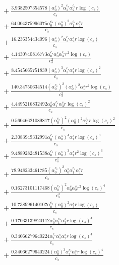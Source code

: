 \documentclass[10pt]{article}
\begin{document}
\begin{align*}
&{}  + \frac{3.9382507354578 \left(\alpha_{0}^s\right)^{2} \alpha_{1}^{c_s} \alpha_{2}^{c_s} r \log{\left(c_{s} \right)}}{c_{s}} \\
&{}  + \frac{64.004375996075 \alpha_{0}^{c_s} \left(\alpha_{0}^s\right)^{2} \alpha_{1}^{c_s} \alpha_{1}^s r}{c_{s}} \\
&{}  + \frac{16.236354434096 \left(\alpha_{0}^s\right)^{2} \alpha_{1}^{c_s} \alpha_{2}^s r \log{\left(c_{s} \right)}}{c_{s}} \\
&{}  + \frac{4.1430740816773 \alpha_{0}^{c_s} \alpha_{0}^s \alpha_{3}^{c_s} r^{2} \log{\left(c_{s} \right)}}{c_{s}^{2}} \\
&{}  + \frac{8.4545665751839 \left(\alpha_{0}^s\right)^{3} \alpha_{1}^{c_s} \alpha_{1}^s r \log{\left(c_{s} \right)}^{2}}{c_{s}} \\
&{}  + \frac{140.34750634514 \left(\alpha_{0}^{c_s}\right)^{2} \left(\alpha_{0}^s\right)^{2} \alpha_{1}^s r^{2} \log{\left(c_{s} \right)}}{c_{s}^{2}} \\
&{}  + \frac{4.4495216832492 \alpha_{0}^s \alpha_{1}^{c_s} \alpha_{3}^s r \log{\left(c_{s} \right)}^{2}}{c_{s}} \\
&{}  + \frac{0.56046621089817 \left(\alpha_{0}^{c_s}\right)^{2} \left(\alpha_{0}^s\right)^{2} \alpha_{2}^{c_s} r \log{\left(c_{s} \right)}^{2}}{c_{s}} \\
&{}  + \frac{2.3083949332991 \alpha_{0}^{c_s} \left(\alpha_{0}^s\right)^{4} \alpha_{1}^s r \log{\left(c_{s} \right)}^{3}}{c_{s}} \\
&{}  + \frac{9.4889282481538 \alpha_{0}^{c_s} \left(\alpha_{0}^s\right)^{3} \alpha_{1}^s r^{2} \log{\left(c_{s} \right)}^{3}}{c_{s}^{2}} \\
&{}  + \frac{78.948233461785 \left(\alpha_{0}^{c_s}\right)^{2} \alpha_{0}^s \alpha_{1}^{c_s} \alpha_{1}^s r}{c_{s}} \\
&{}  + \frac{0.16273101117468 \left(\alpha_{0}^{c_s}\right)^{2} \alpha_{0}^s \alpha_{2}^s r^{2} \log{\left(c_{s} \right)}^{4}}{c_{s}^{2}} \\
&{}  + \frac{10.738996140107 \alpha_{0}^{c_s} \left(\alpha_{0}^s\right)^{2} \alpha_{3}^s r \log{\left(c_{s} \right)}}{c_{s}} \\
&{}  + \frac{0.17033139820112 \alpha_{0}^s \alpha_{1}^{c_s} \alpha_{3}^s r \log{\left(c_{s} \right)}^{4}}{c_{s}} \\
&{}  + \frac{0.34066279640224 \alpha_{1}^{c_s} \alpha_{1}^s \alpha_{2}^s r \log{\left(c_{s} \right)}^{4}}{c_{s}} \\
&{}  + \frac{0.34066279640224 \left(\alpha_{0}^s\right)^{3} \alpha_{1}^{c_s} \alpha_{1}^s r \log{\left(c_{s} \right)}^{4}}{c_{s}} \\

\end{align*}
\end{document}
